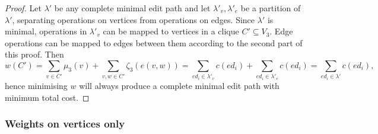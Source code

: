 \documentclass{article}
\theoremstyle{definition}
\begin{document}
\begin{proof}
  Let $\lambda'$ be any complete minimal edit path and let $\lambda'_v, \lambda'_e$ be a partition of $\lambda'$, separating operations on vertices from operations on edges. Since $\lambda'$ is minimal, operations in $\lambda'_v$ can be mapped to vertices in a clique $C' \subseteq V_3$. Edge operations can be mapped to edges between them according to the second part of this proof. Then
  \[ w(C') = \sum_{v \in C'} \mu_3(v) + \sum_{v, w \in C'} \zeta_3(e(v, w)) = \sum_{ed_i \in \lambda'_v} c(ed_i) + \sum_{ed_i \in \lambda'_e} c(ed_i) = \sum_{ed_i \in \lambda'} c(ed_i), \]
  hence minimising $w$ will always produce a complete minimal edit path with minimum total cost.
\end{proof}
\subsubsection{Weights on vertices only}
\label{sec:vertex}
\end{document}
